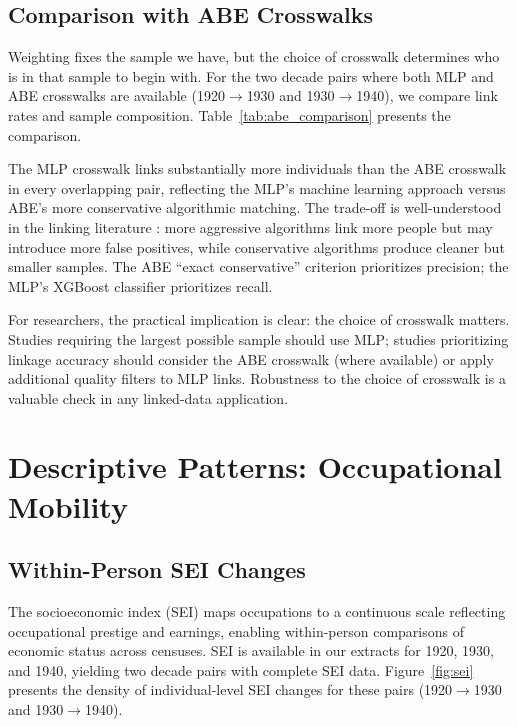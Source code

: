 \documentclass[12pt]{article}
\begin{document}
\subsection{Comparison with ABE Crosswalks}

Weighting fixes the sample we have, but the choice of crosswalk determines who is in that sample to begin with. For the two decade pairs where both MLP and ABE crosswalks are available (1920$\rightarrow$1930 and 1930$\rightarrow$1940), we compare link rates and sample composition. Table~\ref{tab:abe_comparison} presents the comparison.



The MLP crosswalk links substantially more individuals than the ABE crosswalk in every overlapping pair, reflecting the MLP's machine learning approach versus ABE's more conservative algorithmic matching. The trade-off is well-understood in the linking literature \citep{abramitzky2021linking, bailey2020}: more aggressive algorithms link more people but may introduce more false positives, while conservative algorithms produce cleaner but smaller samples. The ABE ``exact conservative'' criterion prioritizes precision; the MLP's XGBoost classifier prioritizes recall.

For researchers, the practical implication is clear: the choice of crosswalk matters. Studies requiring the largest possible sample should use MLP; studies prioritizing linkage accuracy should consider the ABE crosswalk (where available) or apply additional quality filters to MLP links. Robustness to the choice of crosswalk is a valuable check in any linked-data application.


\section{Descriptive Patterns: Occupational Mobility}\label{sec:occ}

\subsection{Within-Person SEI Changes}

The socioeconomic index (SEI) maps occupations to a continuous scale reflecting occupational prestige and earnings, enabling within-person comparisons of economic status across censuses. SEI is available in our extracts for 1920, 1930, and 1940, yielding two decade pairs with complete SEI data. Figure~\ref{fig:sei} presents the density of individual-level SEI changes for these pairs (1920$\rightarrow$1930 and 1930$\rightarrow$1940).
\end{document}
